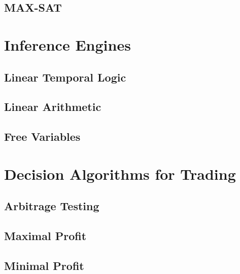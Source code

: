 \documentclass[a4paper,11pt]{book}
\begin{document}
\subsection{MAX-SAT}
\section{Inference Engines}
\subsection{Linear Temporal Logic}
\subsection{Linear Arithmetic}
\subsection{Free Variables}
\section{Decision Algorithms for Trading}
\subsection{Arbitrage Testing}
\subsection{Maximal Profit}
\subsection{Minimal Profit}



\end{document}
